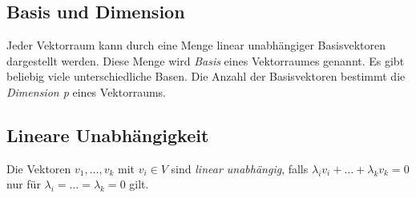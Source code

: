 \subsection{Basis und Dimension}
Jeder Vektorraum kann durch eine Menge linear unabh\"angiger Basisvektoren dargestellt werden. Diese Menge wird \textit{Basis} eines Vektorraumes genannt. Es gibt beliebig viele unterschiedliche Basen. Die Anzahl der Basisvektoren bestimmt die \textit{Dimension p} eines Vektorraums.



\subsection{Lineare Unabh\"angigkeit}
Die Vektoren $v_1,\dots,v_k$ mit $v_i \in V$ sind \textit{linear unabh\"angig}, falls $\lambda_iv_i+\dots+\lambda_kv_k = 0$ nur f\"ur $\lambda_i=\dots=\lambda_k= 0$ gilt. 

%
